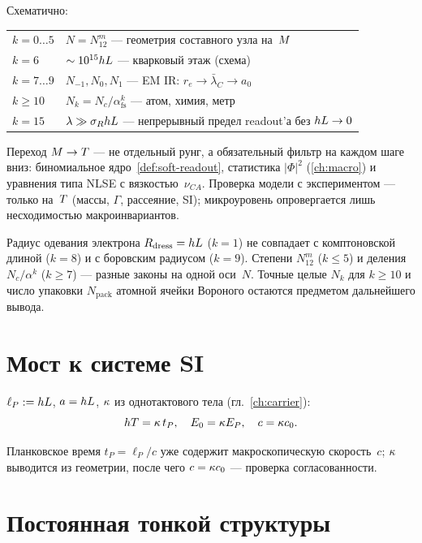 Схематично:
\begin{center}
\small
\begin{tabular}{@{}l@{\quad}l@{}}
$k=0\ldots 5$ & $N=N_{12}^{m}$ --- геометрия составного узла на~$M$ \\
$k=6$ & $\sim 10^{15}hL$ --- кварковый этаж (схема) \\
$k=7\ldots 9$ & $N_{-1},N_0,N_1$ --- EM IR: $r_e\to\bar\lambda_C\to a_0$ \\
$k\geq 10$ & $N_k=N_c/\alpha_{\mathrm{fs}}^{k}$ --- атом, химия, метр \\
$k=15$ & $\lambda\gg\sigma_RhL$ --- непрерывный предел readout'а без $hL\to 0$ \\
\end{tabular}
\end{center}

Переход $M\to T$ --- не отдельный рунг, а обязательный фильтр на каждом шаге вниз:
биномиальное ядро~\cref{def:soft-readout}, статистика $|\Phi|^2$ (\cref{ch:macro})
и уравнения типа NLSE с вязкостью~$\nu_{CA}$.
Проверка модели с экспериментом --- только на~$T$ (массы, $\Gamma$, рассеяние, SI);
микроуровень опровергается лишь несходимостью макроинвариантов.

\begin{remark}
Радиус одевания электрона $R_{\mathrm{dress}}=hL$ ($k=1$) не совпадает
с комптоновской длиной ($k=8$) и с боровским радиусом ($k=9$).
Степени $N_{12}^{m}$ ($k\leq 5$) и деления $N_c/\alpha^{k}$ ($k\geq 7$) ---
разные законы на одной оси~$N$.
Точные целые $N_k$ для $k\geq 10$ и число упаковки $N_{\mathrm{pack}}$
атомной ячейки Вороного остаются предметом дальнейшего вывода.
\end{remark}

\section{Мост к системе SI}

\begin{definition}
\label{def:si-bridge}
$\ell_P:=hL$, $a=hL$, $\kappa$ из однотактового тела (гл.~\ref{ch:carrier}):
\[
  hT=\kappa\, t_P,\quad E_0=\kappa E_P,\quad c=\kappa c_0.
\]
\end{definition}

Планковское время $t_P=\ell_P/c$ уже содержит макроскопическую скорость~$c$;
$\kappa$ выводится из геометрии, после чего $c=\kappa c_0$ --- проверка согласованности.

\section{Постоянная тонкой структуры}

